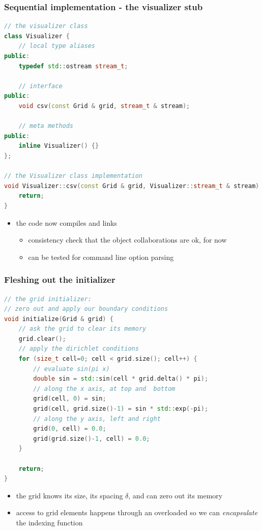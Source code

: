 \begin{frame}[fragile]
%
  \frametitle{Sequential implementation - the visualizer stub}
%
  \begin{lstlisting}[language=c++,name=seq:frame, firstnumber=1]
// the visualizer class
class Visualizer {
    // local type aliases
public:
    typedef std::ostream stream_t;

    // interface
public:
    void csv(const Grid & grid, stream_t & stream);

    // meta methods
public:
    inline Visualizer() {}
};

// the Visualizer class implementation
void Visualizer::csv(const Grid & grid, Visualizer::stream_t & stream) {
    return;
}
  \end{lstlisting}
%

\begin{itemize}
\item the code now compiles and links
  \begin{itemize}
  \item consistency check that the object collaborations are ok, for now
  \item can be tested for command line option parsing
  \end{itemize}
\end{itemize}
% 
\end{frame}

\begin{frame}[fragile]
%
  \frametitle{Fleshing out the initializer}
%
  \begin{lstlisting}[language=c++,name=seq:initializer]
// the grid initializer:
// zero out and apply our boundary conditions 
void initialize(Grid & grid) {
    // ask the grid to clear its memory
    grid.clear();
    // apply the dirichlet conditions
    for (size_t cell=0; cell < grid.size(); cell++) {
        // evaluate sin(pi x)
        double sin = std::sin(cell * grid.delta() * pi);
        // along the x axis, at top and  bottom
        grid(cell, 0) = sin;
        grid(cell, grid.size()-1) = sin * std::exp(-pi);
        // along the y axis, left and right
        grid(0, cell) = 0.0;
        grid(grid.size()-1, cell) = 0.0;
    }

    return;
}
  \end{lstlisting}
%
  \begin{itemize}
  \item the grid knows its size, its spacing $\delta$, and can zero out its  memory
  \item access to grid elements happens through an overloaded  so we can
    {\em encapsulate} the indexing function
  \end{itemize}
%
\end{frame}

